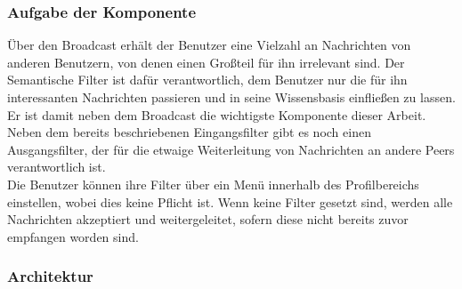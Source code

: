 \subsubsection{Aufgabe der Komponente}
Über den Broadcast erhält der Benutzer eine Vielzahl an Nachrichten von anderen Benutzern, von denen einen Großteil für ihn irrelevant sind. Der Semantische Filter ist dafür verantwortlich, dem Benutzer nur die für ihn interessanten Nachrichten passieren und in seine Wissensbasis einfließen zu lassen. Er ist damit neben dem Broadcast die wichtigste Komponente dieser Arbeit. Neben dem bereits beschriebenen Eingangsfilter gibt es noch einen Ausgangsfilter, der für die etwaige Weiterleitung von Nachrichten an andere Peers verantwortlich ist. 
\\Die Benutzer können ihre Filter über ein Menü innerhalb des Profilbereichs einstellen, wobei dies keine Pflicht ist. Wenn keine Filter gesetzt sind, werden alle Nachrichten akzeptiert und weitergeleitet, sofern diese nicht bereits zuvor empfangen worden sind. 

\subsubsection{Architektur}

